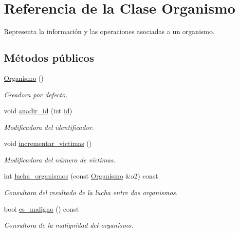 \hypertarget{class_organismo}{\section{Referencia de la Clase Organismo}
\label{class_organismo}
}


Representa la información y las operaciones asociadas a un organismo.  


\subsection*{Métodos públicos}
\begin{DoxyCompactItemize}
\item 
\hyperlink{class_organismo_aa5dbeed205b53c0e555ef2a6456da144}{Organismo} ()
\begin{DoxyCompactList}\small\item\em Creadora por defecto. \end{DoxyCompactList}\item 
void \hyperlink{class_organismo_a4fa50ea637c25ee2b04bd1805ec634dc}{anadir\+\_\+id} (int \hyperlink{class_organismo_a30be1823d3711fec651a5a4b1dc1cee5}{id})
\begin{DoxyCompactList}\small\item\em Modificadora del identificador. \end{DoxyCompactList}\item 
void \hyperlink{class_organismo_ae498385e40b42c4e9b11226befd6e4c6}{incrementar\+\_\+victimas} ()
\begin{DoxyCompactList}\small\item\em Modificadora del número de víctimas. \end{DoxyCompactList}\item 
int \hyperlink{class_organismo_a2f4573f69288fa8ec05ec709f2336a8d}{lucha\+\_\+organismos} (const \hyperlink{class_organismo}{Organismo} \&o2) const 
\begin{DoxyCompactList}\small\item\em Consultora del resultado de la lucha entre dos organismos. \end{DoxyCompactList}\item 
bool \hyperlink{class_organismo_aa746619493d11ed0b2eb2c75ce202ad0}{es\+\_\+maligno} () const 
\begin{DoxyCompactList}\small\item\em Consultora de la malignidad del organismo. \end{DoxyCompactList}\item 

\end{DoxyCompactItemize}
